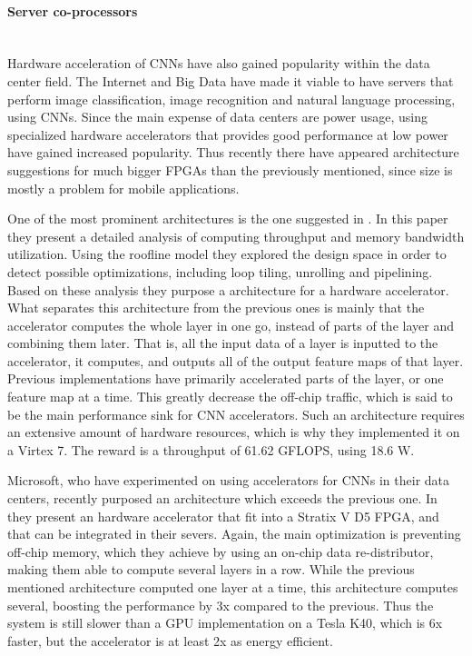 \paragraph{Server co-processors} \hfil \\
Hardware acceleration of CNNs have also gained popularity within the data center field. The Internet and Big Data have made it viable to have servers that perform image classification, image recognition and natural language processing, using CNNs. Since the main expense of data centers are power usage, using specialized hardware accelerators that provides good performance at low power have gained increased popularity. Thus recently there have appeared architecture suggestions for much bigger FPGAs than the previously mentioned, since size is mostly a problem for mobile applications. 

One of the most prominent architectures is the one suggested in \cite{Zhang2015}. In this paper they present a detailed analysis of computing throughput and memory bandwidth utilization. Using the roofline model \cite{Williams2009} they explored the design space in order to detect possible optimizations, including loop tiling, unrolling and pipelining. Based on these analysis they purpose a architecture for a hardware accelerator. What separates this architecture from the previous ones is mainly that the accelerator computes the whole layer in one go, instead of parts of the layer and combining them later. That is, all the input data of a layer is inputted to the accelerator, it computes, and outputs all of the output feature maps of that layer. Previous implementations have primarily accelerated parts of the layer, or one feature map at a time. This greatly decrease the off-chip traffic, which is said to be the main performance sink for CNN accelerators. Such an architecture requires an extensive amount of hardware resources, which is why they implemented it on a Virtex 7. The reward is a throughput of 61.62 GFLOPS, using 18.6 W.   

Microsoft, who have experimented on using accelerators for CNNs in their data centers, recently purposed an architecture which exceeds the previous one. In \cite{Ovtcharov2015} they present an hardware accelerator that fit into a Stratix V D5 FPGA, and that can be integrated in their severs. Again, the main optimization is preventing off-chip memory, which they achieve by using an on-chip data re-distributor, making them able to compute several layers in a row. While the previous mentioned architecture computed one layer at a time, this architecture computes several, boosting the performance by 3x compared to the previous. Thus the system is still slower than a GPU implementation on a Tesla K40, which is 6x faster, but the accelerator is at least 2x as energy efficient.
 

